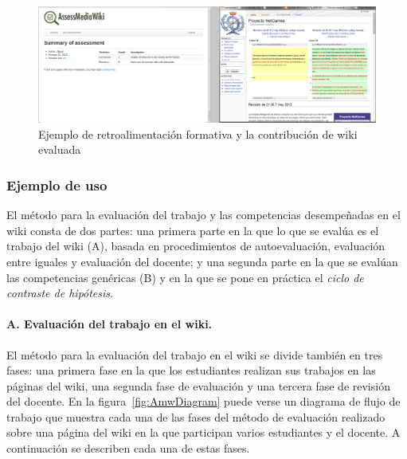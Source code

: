 \begin{figure}
  \begin{center}
    \includegraphics[scale=0.19]{AmwFormative.png}
  \end{center}
  \caption{Ejemplo de retroalimentación formativa y la contribución de wiki evaluada}
  \label{fig:AmwFormative}
\end{figure}

			\subsubsection{Ejemplo de uso}

			El método para la evaluación del trabajo y las competencias desempeñadas en el wiki consta de dos partes: una primera parte en la que lo que se evalúa es el trabajo del wiki (A), basada en procedimientos de autoevaluación, evaluación entre iguales y evaluación del docente; y una segunda parte en la que se evalúan las competencias genéricas (B) y en la que se pone en práctica el \emph{ciclo de contraste de hipótesis}.

			\paragraph*{A. Evaluación del trabajo en el wiki.}

			El método para la evaluación del trabajo en el wiki se divide también en tres fases: una primera fase en la que los estudiantes realizan sus trabajos en las páginas del wiki, una segunda fase de evaluación y una tercera fase de revisión del docente. En la figura~\ref{fig:AmwDiagram} puede verse un diagrama de flujo de trabajo que muestra cada una de las fases del método de evaluación realizado sobre una página del wiki en la que participan varios estudiantes y el docente. A continuación se describen cada una de estas fases.

